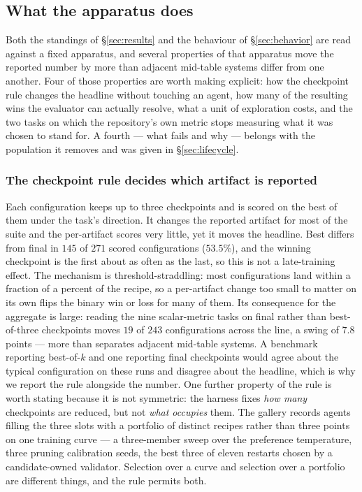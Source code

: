 \subsection{What the apparatus does}
\label{sec:analysis}

Both the standings of \S\ref{sec:results} and the behaviour of \S\ref{sec:behavior} are read
against a fixed apparatus, and several properties of that apparatus move the
reported number by more than adjacent mid-table systems differ from one another. Four of those properties are worth making explicit: how the
checkpoint rule changes the headline without touching an agent, how many of the resulting wins the
evaluator can actually resolve, what a unit of exploration costs, and the two tasks on which the
repository's own metric stops measuring what it was chosen to stand for.
A fourth --- what fails and why --- belongs with the population it removes and was given in
\S\ref{sec:lifecycle}.

\subsubsection{The checkpoint rule decides which artifact is reported}
\label{sec:ckpt}

Each configuration keeps up to three checkpoints and is scored on the best of them under the task's
direction. It changes the reported artifact for most of the suite and the
per-artifact scores very little, yet it moves the headline. Best
differs from final in $145$ of $271$ scored configurations ($53.5\%$), and the winning checkpoint is
the first about as often as the last, so this is not a late-training effect. The mechanism is
threshold-straddling: most configurations land within a fraction of a percent of the recipe, so a
per-artifact change too small to matter on its own flips the binary win or loss for many of them. Its consequence for the
aggregate is large: reading the nine scalar-metric tasks on final rather than best-of-three
checkpoints moves $19$ of $243$ configurations across the line, a swing of $7.8$ points --- more than separates
adjacent mid-table systems. A benchmark reporting best-of-$k$ and one reporting final checkpoints would agree
about the typical configuration on these runs and disagree about the headline, which is why we report
the rule alongside the number. One further property of the rule is worth stating because it is not
symmetric: the harness fixes \emph{how many} checkpoints are reduced, but not \emph{what occupies}
them. The gallery records agents filling the three slots with a portfolio of distinct recipes rather
than three points on one training curve --- a three-member sweep over the preference temperature,
three pruning calibration seeds, the best three of eleven restarts chosen by a candidate-owned
validator. Selection over a curve and selection over a portfolio are different things, and the rule
permits both.

